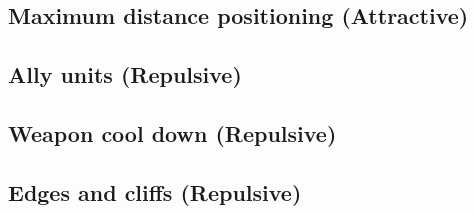 
		
	
	 
	\subsection*{Maximum distance positioning (Attractive)}
	\subsection*{Ally units (Repulsive)}
	\subsection*{Weapon cool down (Repulsive)}
	\subsection*{Edges and cliffs (Repulsive)}